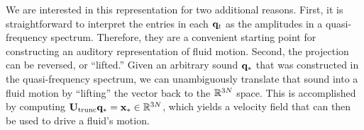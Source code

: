 \documentclass[11pt]{article}
\begin{document}



We are interested in this representation for two additional reasons. First, it is straightforward to interpret the entries in each $\mathbf{q}_t$ as the amplitudes in a quasi-frequency spectrum. Therefore, they are a convenient starting point for constructing an auditory representation of fluid motion. Second, the projection can be reversed, or ``lifted.'' Given an arbitrary sound $\mathbf{q}_*$ that was constructed in the quasi-frequency spectrum, we can unambiguously translate that sound into a fluid motion by ``lifting'' the vector back to the $\mathbb{R}^{3N}$ space. This is accomplished by computing $\mathbf{U}_{\textnormal{trunc}} \mathbf{q}_* = \mathbf{x}_*\in \mathbb{R}^{3N}$, which yields a velocity field that can then be used to drive a fluid's motion.
\end{document}
